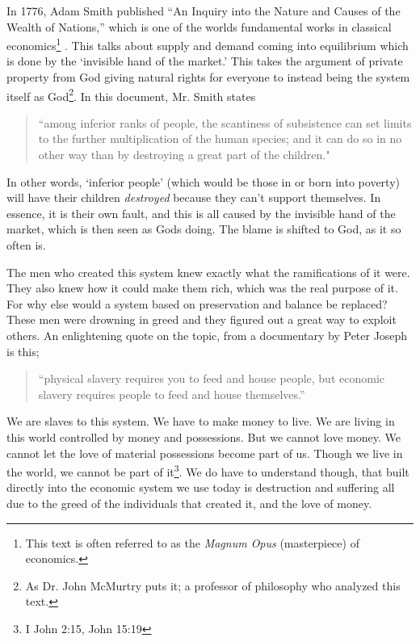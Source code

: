 \documentclass[11pt]{article}
\begin{document}
\begin{multicols}{2}
In 1776, Adam Smith published ``An Inquiry into the Nature and Causes of the Wealth of Nations,” which is one of the worlds fundamental works in classical economics\footnote{This text is often referred to as the \textit{Magnum Opus} (masterpiece) of economics.} \cite{WealthofNations}. This talks about supply and demand coming into equilibrium which is done by the ‘invisible hand of the market.’ This takes the argument of private property from God giving natural rights for everyone to instead being the system itself as God\footnote{As Dr. John McMurtry puts it; a professor of philosophy who analyzed this text.}. In this document, Mr. Smith states 
\begin{quotation}
``among inferior ranks of people, the scantiness of subsistence can set limits to the further multiplication of the human species; and it can do so in no other way than by destroying a great part of the children."
\end{quotation}
In other words, `inferior people' (which would be those in or born into poverty) will have their children \textit{destroyed} because they can't support themselves. In essence, it is their own fault, and this is all caused by the invisible hand of the market, which is then seen as Gods doing. The blame is shifted to God, as it so often is. 

The men who created this system knew exactly what the ramifications of it were. They also knew how it could make them rich, which was the real purpose of it. For why else would a system based on preservation and balance be replaced? These men were drowning in greed and they figured out a great way to exploit others. An enlightening quote on the topic, from a documentary by Peter Joseph is this; 
\begin{quotation}
``physical slavery requires you to feed and house people, but economic slavery requires people to feed and house themselves.”
\end{quotation} 
We are slaves to this system. We have to make money to live. We are living in this world controlled by money and possessions. But we cannot love money. We cannot let the love of material possessions become part of us. Though we live in the world, we cannot be part of it\footnote{I John 2:15, John 15:19}. We do have to understand though, that built directly into the economic system we use today is destruction and suffering all due to the greed of the individuals that created it, and the love of money.


\end{multicols}
\end{document}
